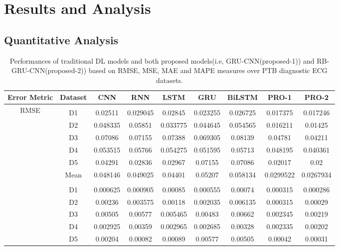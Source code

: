 \documentclass[a4paper, fleqn]{cas-sc}
\begin{document}
\section{Results and Analysis}

\subsection{Quantitative Analysis}



\begin{table}[!p]
    \centering
    \caption{Performances of traditional DL models and both proposed models(i.e,  GRU-CNN(proposed-1)) and RB-GRU-CNN(proposed-2)) based on RMSE,  MSE,  MAE and MAPE measures over PTB diagnostic ECG datasets.}
    \label{tab:error_metrics}
    \begin{tabular}{ccccccccc}
        \toprule
        Error Metric & Dataset & CNN & RNN & LSTM & GRU & BiLSTM & PRO-1 & PRO-2 \\
        \midrule
        \multirow{9}{*}{RMSE} \\
        & D1 & 0.02511 & 0.029045 & 0.02845 & 0.023255 & 0.026725 & 0.017375 & 0.017246 \\
        & D2 & 0.048335 & 0.05851 & 0.033775 & 0.044645 & 0.054565 & 0.016211 & 0.01425 \\
        & D3 & 0.07086 & 0.07155 & 0.07388 & 0.069305 & 0.08139 & 0.04781 & 0.04211\\
        & D4 & 0.053515 & 0.05766 & 0.054275 & 0.051595 & 0.05713 & 0.048195 & 0.040361\\
        & D5 & 0.04291 & 0.02836 & 0.02967 & 0.07155 & 0.07086 & 0.02017 & 0.02\\
        & Mean & 0.048146 & 0.049025 & 0.04401 & 0.05207 & 0.058134 & 0.0299522 & 0.0267934 \\
        \midrule
        \multirow{9}{*}{MSE}\\
        & D1 & 0.000625 & 0.000905 & 0.00085 & 0.000555 & 0.00074 & 0.000315 & 0.000286 \\
        & D2 & 0.00236 & 0.003575 & 0.00118 & 0.002035 & 0.006135 & 0.000315 & 0.00029\\
        & D3 & 0.00505  & 0.00577 & 0.005465 & 0.00483 & 0.00662 & 0.002345 & 0.00219 \\
        & D4 & 0.002925 & 0.00359 & 0.002965 & 0.002685 & 0.00328 & 0.002335 & 0.00202 \\
        & D5 & 0.00204 & 0.00082 & 0.00089 & 0.00577 & 0.00505 & 0.00042 & 0.00031 \\

\end{tabular}
\end{table}
\end{document}

